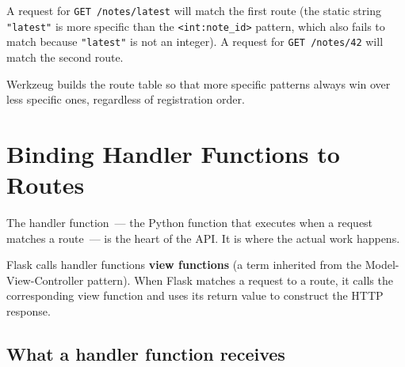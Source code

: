 \begin{codebox}[short]

\begin{Shaded}
\begin{Highlighting}[]
\NormalTok{(}\OperatorTok{=}\NormalTok{[}\NormalTok{])}

\NormalTok{(}\OperatorTok{=}\NormalTok{[}\NormalTok{])}
\end{Highlighting}
\end{Shaded}

\end{codebox}

\noindent{}A request for \texttt{GET\ /notes/latest} will match the first route (the static string \texttt{"latest"} is more specific than the \texttt{\textless{}int:note\_id\textgreater{}} pattern, which also fails to match because \texttt{"latest"} is not an integer). A request for \texttt{GET\ /notes/42} will match the second route.

Werkzeug builds the route table so that more specific patterns always win over less specific ones, regardless of registration order.

\setcounter{section}{4}
\section{Binding Handler Functions to Routes}\label{04-request-handling-paths:45-binding-handler-functions-to-routes}

The handler function~--- the Python function that executes when a request matches a route~--- is the heart of the API. It is where the actual work happens.

Flask calls handler functions \textbf{view functions} (a term inherited from the Model-View-Controller pattern). When Flask matches a request to a route, it calls the corresponding view function and uses its return value to construct the HTTP response.

\subsection*{What a handler function receives}\label{04-request-handling-paths:what-a-handler-function-receives}

